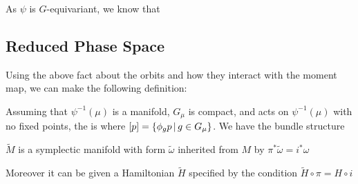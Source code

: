 \documentclass{article}
\begin{document}
As $\psi$ is $G$-equivariant, we know that 
\subsection{Reduced Phase Space}
Using the above fact about the orbits and how they interact with the moment map, we can make the following definition:
\begin{definition}
Assuming that $\psi^{-1}(\mu)$ is a manifold, $G_\mu$ is compact, and acts on $\psi^{-1}(\mu)$ with no fixed points, the  is 
where $[p] = \left\{ \phi_g p \, | \, g \in G_\mu \right\}$. 
We have the bundle structure 
\begin{center}
\end{center}
\end{definition}

$\tilde{M}$ is a symplectic manifold with form $\tilde{\omega}$ inherited from $M$ by $\pi^\ast \tilde{\omega} = i^\ast \omega$

\begin{center}
\end{center}

Moreover it can be given a Hamiltonian $\tilde{H}$ specified by the condition $\tilde{H}\circ \pi = H \circ i $



\end{document}
